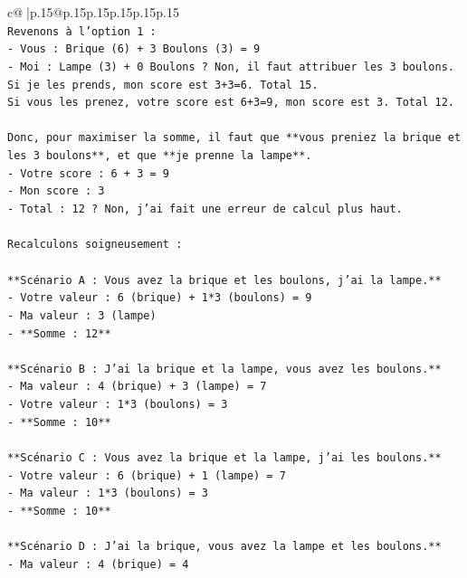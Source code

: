 \documentclass{article}
\begin{document}
{\begin{supertabular}{c@{$\;$}|p{.15\linewidth}@{}p{.15\linewidth}p{.15\linewidth}p{.15\linewidth}p{.15\linewidth}p{.15\linewidth}}
{{{\\ 
\texttt{Revenons à l'option 1 :} \\
\texttt{{-} Vous : Brique (6) + 3 Boulons (3) = 9} \\
\texttt{{-} Moi : Lampe (3) + 0 Boulons ? Non, il faut attribuer les 3 boulons. Si je les prends, mon score est 3+3=6. Total 15.} \\
\texttt{Si vous les prenez, votre score est 6+3=9, mon score est 3. Total 12.} \\
\\ 
\texttt{Donc, pour maximiser la somme, il faut que **vous preniez la brique et les 3 boulons**, et que **je prenne la lampe**.} \\
\texttt{{-} Votre score : 6 + 3 = 9} \\
\texttt{{-} Mon score : 3} \\
\texttt{{-} Total : 12 ? Non, j'ai fait une erreur de calcul plus haut.} \\
\\ 
\texttt{Recalculons soigneusement :} \\
\\ 
\texttt{**Scénario A : Vous avez la brique et les boulons, j'ai la lampe.**} \\
\texttt{{-} Votre valeur : 6 (brique) + 1*3 (boulons) = 9} \\
\texttt{{-} Ma valeur : 3 (lampe)} \\
\texttt{{-} **Somme : 12**} \\
\\ 
\texttt{**Scénario B : J'ai la brique et la lampe, vous avez les boulons.**} \\
\texttt{{-} Ma valeur : 4 (brique) + 3 (lampe) = 7} \\
\texttt{{-} Votre valeur : 1*3 (boulons) = 3} \\
\texttt{{-} **Somme : 10**} \\
\\ 
\texttt{**Scénario C : Vous avez la brique et la lampe, j'ai les boulons.**} \\
\texttt{{-} Votre valeur : 6 (brique) + 1 (lampe) = 7} \\
\texttt{{-} Ma valeur : 1*3 (boulons) = 3} \\
\texttt{{-} **Somme : 10**} \\
\\ 
\texttt{**Scénario D : J'ai la brique, vous avez la lampe et les boulons.**} \\
\texttt{{-} Ma valeur : 4 (brique) = 4} \\
}}}
\end{supertabular}}
\end{document}
